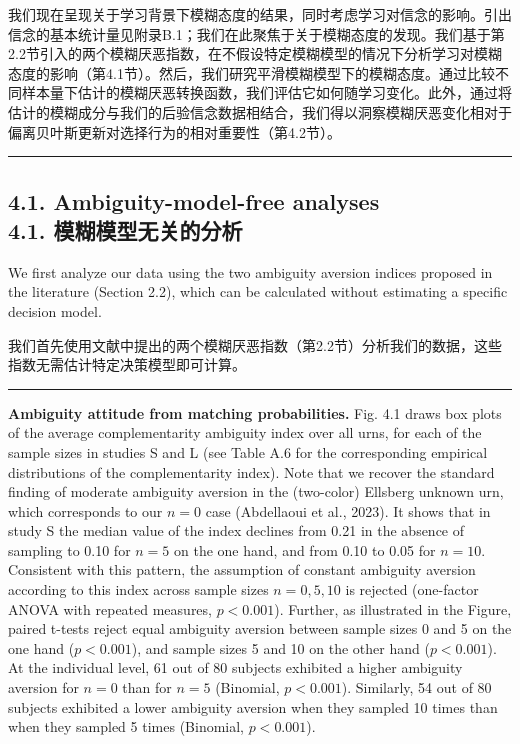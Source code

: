 \documentclass[12pt,a4paper]{article}
\newenvironment{original}
  {\par\vspace{0.5em}\noindent\color{black}\ignorespaces}
  {\par\vspace{0.3em}}
\newenvironment{translation}
  {\par\noindent\color{transblue}\ignorespaces}
  {\par\vspace{0.8em}\hrule\vspace{0.5em}}
\newcommand{\bilingualsubsection}[2]{%
  \subsection{\texorpdfstring{#1 \\[0.2em] {\normalsize\color{transblue}#2}}{#1}}
}
\begin{document}
\begin{translation}
我们现在呈现关于学习背景下模糊态度的结果，同时考虑学习对信念的影响。引出信念的基本统计量见附录B.1；我们在此聚焦于关于模糊态度的发现。我们基于第2.2节引入的两个模糊厌恶指数，在不假设特定模糊模型的情况下分析学习对模糊态度的影响（第4.1节）。然后，我们研究平滑模糊模型下的模糊态度。通过比较不同样本量下估计的模糊厌恶转换函数，我们评估它如何随学习变化。此外，通过将估计的模糊成分与我们的后验信念数据相结合，我们得以洞察模糊厌恶变化相对于偏离贝叶斯更新对选择行为的相对重要性（第4.2节）。
\end{translation}

\bilingualsubsection{4.1. Ambiguity-model-free analyses}{4.1. 模糊模型无关的分析}

\begin{original}
We first analyze our data using the two ambiguity aversion indices proposed in the literature (Section 2.2), which can be calculated without estimating a specific decision model.
\end{original}

\begin{translation}
我们首先使用文献中提出的两个模糊厌恶指数（第2.2节）分析我们的数据，这些指数无需估计特定决策模型即可计算。
\end{translation}

\begin{original}
\textbf{Ambiguity attitude from matching probabilities.} Fig. 4.1 draws box plots of the average complementarity ambiguity index over all urns, for each of the sample sizes in studies S and L (see Table A.6 for the corresponding empirical distributions of the complementarity index). Note that we recover the standard finding of moderate ambiguity aversion in the (two-color) Ellsberg unknown urn, which corresponds to our $n = 0$ case (Abdellaoui et al., 2023). It shows that in study S the median value of the index declines from 0.21 in the absence of sampling to 0.10 for $n = 5$ on the one hand, and from 0.10 to 0.05 for $n = 10$. Consistent with this pattern, the assumption of constant ambiguity aversion according to this index across sample sizes $n = 0, 5, 10$ is rejected (one-factor ANOVA with repeated measures, $p < 0.001$). Further, as illustrated in the Figure, paired t-tests reject equal ambiguity aversion between sample sizes 0 and 5 on the one hand ($p < 0.001$), and sample sizes 5 and 10 on the other hand ($p < 0.001$). At the individual level, 61 out of 80 subjects exhibited a higher ambiguity aversion for $n = 0$ than for $n = 5$ (Binomial, $p < 0.001$). Similarly, 54 out of 80 subjects exhibited a lower ambiguity aversion when they sampled 10 times than when they sampled 5 times (Binomial, $p < 0.001$).
\end{original}
\end{document}

